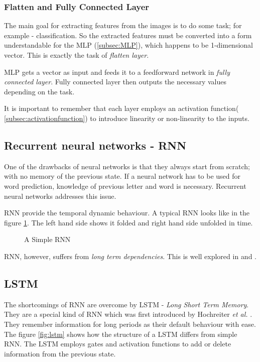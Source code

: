 \subsubsection*{Flatten and Fully Connected Layer}
The main goal for extracting features from the images is to do some task; for example -
classification. So the extracted features must be converted into a form understandable for
the MLP (\ref{subsec:MLP}), which happens to be 1-dimensional vector. This is exactly the
task of \textit{flatten layer}.

MLP gets a vector as input and feeds it to a feedforward network in \textit{fully
connected layer}. Fully connected layer then outputs the necessary values depending on the
task.

It is important to remember that each layer employs an activation function(
\ref{subsec:activationfunction}) to introduce linearity or non-linearity to the inputs.

\subsection{Recurrent neural networks - RNN}
One of the drawbacks of neural networks is that they always start from scratch; with no
memory of the previous state. If a neural network has to be used for word prediction,
knowledge of previous letter and word is necessary. Recurrent neural networks addresses
this issue.

RNN provide the temporal dynamic behaviour. A typical RNN looks like in the figure
\ref{fig:RNN}. The left hand side shows it folded and right hand side unfolded in time.
\begin{figure}[!ht]
	\centering
        \def\svgwidth{1.0\textwidth}
        
    \caption{A Simple RNN}
    \label{fig:RNN}
\end{figure}
RNN, however, suffers from \textit{long term dependencies}. This is well explored in
\cite{RNNdrawback1} and \cite{RNNdrawback2}.

\subsection{LSTM}
\label{subsubsec:lstm}
The shortcomings of RNN are overcome by LSTM - \textit{Long Short Term Memory}.
They are a special kind of RNN which was first introduced by Hochreiter \textit{et al.} \cite{LSTMPaper}. They remember
information for long periods as their default behaviour with ease. The figure
\ref{fig:lstm} shows how the structure of a LSTM differs from simple RNN. The LSTM employs
gates and activation functions to add or delete information from the previous state.


